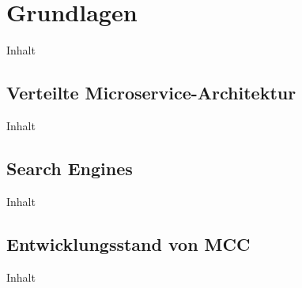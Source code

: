 \chapter{Grundlagen\label{chap2:Zweites-Kapitel}}

Inhalt

\section{Verteilte Microservice-Architektur\label{sec2.1:Unterpunkt-1}}

Inhalt

\section{Search Engines\label{sec2.2:Unterpunkt-2}}

Inhalt

\section{Entwicklungsstand von MCC\label{sec2.3:Unterpunkt-3}}

Inhalt